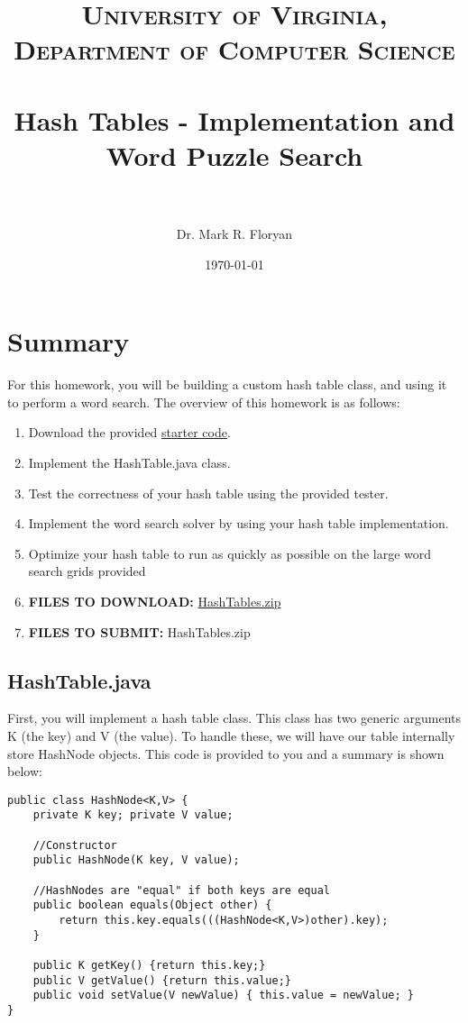 \documentclass[paper=a4, fontsize=11pt, parskip=full]{scrartcl} %
\title{
\normalfont \normalsize
\textsc{University of Virginia, Department of Computer Science} \\ [25pt] %
\horrule{0.5pt} \\[0.4cm] %
\huge Hash Tables - Implementation and Word Puzzle Search \\ %
\horrule{2pt} \\[0.5cm] %
}
\author{Dr. Mark R. Floryan} %
\date{\normalsize\today} %
\numberwithin{equation}{section} %
\numberwithin{figure}{section} %
\numberwithin{table}{section} %
\begin{document}
\maketitle %


\section{Summary}

For this homework, you will be building a custom hash table class, and using it to perform a word search. The overview of this homework is as follows:

\begin{enumerate}
	\item Download the provided \href{https://markfloryan.github.io/dsa1/homeworks/HashTables/code/HashTables.zip}{starter code}.
	\item Implement the HashTable.java class.
	\item Test the correctness of your hash table using the provided tester.
	\item Implement the word search solver by using your hash table implementation.
	\item Optimize your hash table to run as quickly as possible on the large word search grids provided
	\item \textbf{FILES TO DOWNLOAD:} \href{https://markfloryan.github.io/dsa1/homeworks/HashTables/code/HashTables.zip}{HashTables.zip}
	\item \textbf{FILES TO SUBMIT:} HashTables.zip
\end{enumerate}


\subsection{HashTable.java}

First, you will implement a hash table class. This class has two generic arguments K (the key) and V (the value). To handle these, we will have our table internally store HashNode objects. This code is provided to you and a summary is shown below:

\begin{lstlisting}
public class HashNode<K,V> {
	private K key; private V value;
	
	//Constructor
	public HashNode(K key, V value);
	
	//HashNodes are "equal" if both keys are equal
	public boolean equals(Object other) {
		return this.key.equals(((HashNode<K,V>)other).key);
	}
	
	public K getKey() {return this.key;}
	public V getValue() {return this.value;}
	public void setValue(V newValue) { this.value = newValue; }
}
\end{lstlisting}
\end{document}
